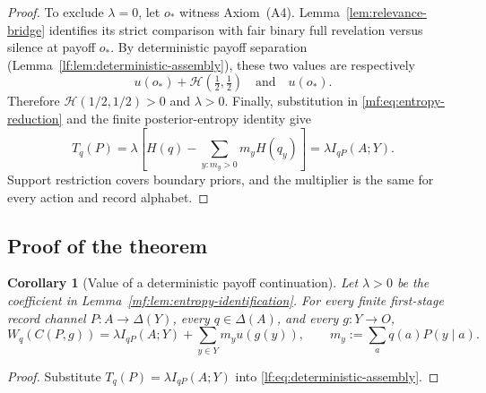 \documentclass[11pt,a4paper]{article}
\newtheorem{corollary}[theorem]{Corollary}
\theoremstyle{definition}
\newcommand{\D}{\Delta}
\newcommand{\Sh}{H}
\newcommand{\1}{\mathbf 1}
\begin{document}
\begin{proof}
To exclude $\lambda=0$, let $o_\ast$ witness Axiom~\textup{(A4)}.
Lemma~\ref{lem:relevance-bridge} identifies its strict comparison with fair
binary full revelation versus silence at payoff $o_\ast$.  By deterministic
payoff separation (Lemma~\ref{lf:lem:deterministic-assembly}), these two
values are respectively
\[
 u(o_\ast)+\mathcal H(\tfrac12,\tfrac12)
 \quad\text{and}\quad u(o_\ast).
\]
Therefore $\mathcal H(1/2,1/2)>0$ and $\lambda>0$.
Finally, substitution in \eqref{mf:eq:entropy-reduction} and the finite
posterior-entropy identity give
\[
 T_q(P)
 =\lambda\left[\Sh(q)-\sum_{y:m_y>0}m_y\Sh(q_y)\right]
 =\lambda I_{qP}(A;Y).
\]
Support restriction covers boundary priors, and the multiplier is the same
for every action and record alphabet.
\end{proof}

\subsection{Proof of the theorem}

\begin{corollary}[Value of a deterministic payoff continuation]
\label{mf:cor:deterministic-value}
Let $\lambda>0$ be the coefficient in
Lemma~\ref{mf:lem:entropy-identification}.  For every finite first-stage
record channel $P:A\to\D(Y)$, every $q\in\D(A)$, and every $g:Y\to O$,
\[
W_q(C(P,g))=\lambda I_{qP}(A;Y)+\sum_{y\in Y}m_yu(g(y)),
\qquad m_y:=\sum_aq(a)P(y\mid a).
\]
\end{corollary}

\begin{proof}
Substitute $T_q(P)=\lambda I_{qP}(A;Y)$ into
\eqref{lf:eq:deterministic-assembly}.
\end{proof}
\end{document}
